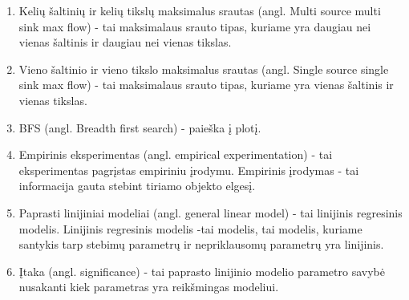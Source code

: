 \begin{enumerate}
	\item Kelių šaltinių ir kelių tikslų maksimalus srautas (angl. Multi source multi sink max flow) - tai maksimalaus srauto tipas, kuriame yra daugiau nei vienas šaltinis ir daugiau nei vienas tikslas.
	\item Vieno šaltinio ir vieno tikslo maksimalus srautas (angl. Single source single sink max flow) - tai maksimalaus srauto tipas, kuriame yra vienas šaltinis ir vienas tikslas.
	\item BFS (angl. Breadth first search) - paieška į plotį.
	\item Empirinis eksperimentas (angl. empirical experimentation) - tai eksperimentas pagrįstas empiriniu įrodymu. Empirinis įrodymas - tai informacija gauta stebint tiriamo objekto elgesį.
	\item Paprasti linijiniai modeliai (angl. general linear model) - tai linijinis regresinis modelis. Linijinis regresinis modelis -tai modelis, tai modelis, kuriame santykis tarp stebimų parametrų ir nepriklausomų parametrų yra linijinis.
	\item Įtaka (angl. significance) - tai paprasto linijinio modelio parametro savybė nusakanti kiek parametras yra reikšmingas modeliui.
\end{enumerate}